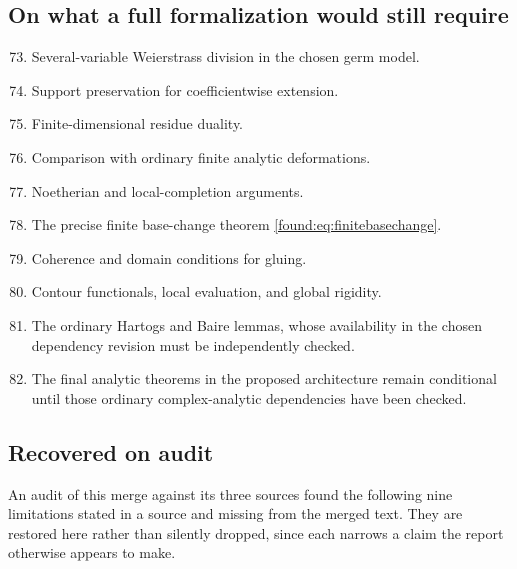 \documentclass[11pt,letterpaper]{article}
\numberwithin{equation}{section}
\theoremstyle{definition}
\theoremstyle{remark}
\begin{document}
\subsection{On what a full formalization would still require}
\label{found:app:limfuture}
\begin{enumerate}\setcounter{enumi}{72}
\item Several-variable Weierstrass division in the chosen germ model.
\item Support preservation for coefficientwise extension.
\item Finite-dimensional residue duality.
\item Comparison with ordinary finite analytic deformations.
\item Noetherian and local-completion arguments.
\item The precise finite base-change theorem
\eqref{found:eq:finitebasechange}.
\item Coherence and domain conditions for gluing.
\item Contour functionals, local evaluation, and global rigidity.
\item The ordinary Hartogs and Baire lemmas, whose availability in the chosen
dependency revision must be independently checked.
\item The final analytic theorems in the proposed architecture remain
conditional until those ordinary complex-analytic dependencies have been checked.
\end{enumerate}

\subsection{Recovered on audit}
An audit of this merge against its three sources found the following nine
limitations stated in a source and missing from the merged text. They are
restored here rather than silently dropped, since each narrows a claim the
report otherwise appears to make.
\end{document}
